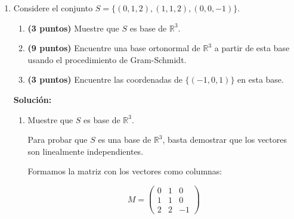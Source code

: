 \documentclass[a4paper]{article}
\begin{document}
\begin{enumerate}
\begin{itemize}
\item Si \( \alpha - 2 \neq 0 \), es decir, \( \alpha \neq 2 \), entonces hay una única solución porque el sistema es compatible determinado (rango de la matriz de coeficientes y el de la aumentada es 3).
\item Si \( \alpha = 2 \), la ecuación implicar\'ia:
\[
0 = -2
\]
lo cual es una contradicción. Por lo tanto, el sistema es incompatible: \textbf{no tiene solución}.
\end{itemize}



Sustituimos \( \alpha = 0 \) en el sistema original:
\[
\left[
\begin{array}{ccc|c}
1 & 3 & 0 & 1 \\
0 & -1 & 1 & -1 \\
0 & 0 & - 2 & 0
\end{array}
\right]
\]


\textbf{Por lo tanto, la única solución es:}
\[
\boxed{(x, y, z) = (-2,\ 1,\ 0)}
\]



\newpage
    \item Considere el conjunto $S=\{ ( 0 , 1 , 2 ), ( 1 , 1 , 2 ), ( 0 , 0 , -1) \}$.
    \begin{enumerate}
        \item {\bf (3 puntos)} Muestre que $S$ es base de $\mathbb{R}^{3}$.
        \item {\bf (9 puntos)} Encuentre una base ortonormal de $\mathbb{R}^{3}$ a partir de esta base usando el procedimiento de Gram-Schmidt.
        \item {\bf (3 puntos)} Encuentre las coordenadas de $\{( -1 ,0 , 1 ) \}$ en esta base.    

\end{enumerate} 
\textbf{Solución:}
\begin{enumerate}

\item Muestre que \( S \) es base de \( \mathbb{R}^3 \).

Para probar que \( S \) es una base de \( \mathbb{R}^3 \), basta demostrar que los vectores son linealmente independientes.

Formamos la matriz con los vectores como columnas:

\[
M = \begin{pmatrix}
0 & 1 & 0 \\
1 & 1 & 0 \\
2 & 2 & -1
\end{pmatrix}
\]


\end{enumerate}
\end{enumerate}
\end{document}
